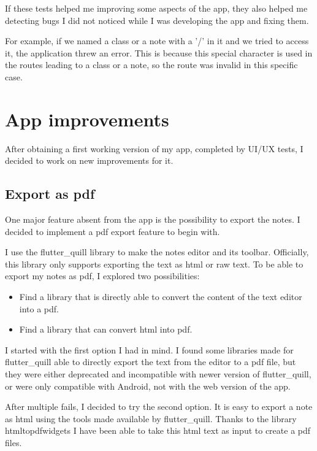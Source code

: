 \documentclass[]{article}
\begin{document}
	\pagebreak
	
	If these tests helped me improving some aspects of the app, they also helped me detecting bugs I did not noticed while I was developing the app and fixing them.\linebreak
	
	For example, if we named a class or a note with a '/' in it and we tried to access it, the application threw an error. This is because this special character is used in the routes leading to a class or a note, so the route was invalid in this specific case.
	
	\section{App improvements}
	
	After obtaining a first working version of my app, completed by UI/UX tests, I decided to work on new improvements for it.
	
	\subsection{Export as pdf}
	
	One major feature absent from the app is the possibility to export the notes.
	I decided to implement a pdf export feature to begin with.\linebreak
	
	I use the flutter\_quill library to make the notes editor and its toolbar.
	Officially, this library only supports exporting the text as html or raw text.
	To be able to export my notes as pdf, I explored two possibilities:
	
	\begin{itemize}
		\item Find a library that is directly able to convert the content of the text editor into a pdf.
		\item Find a library that can convert html into pdf.
	\end{itemize}
	
	I started with the first option I had in mind. I found some libraries made for flutter\_quill able to directly export the text from the editor to a pdf file, but they were either deprecated and incompatible with newer version of flutter\_quill, or were only compatible with Android, not with the web version of the app.\linebreak
	
	After multiple fails, I decided to try the second option. It is easy to export a note as html using the tools made available by flutter\_quill. Thanks to the library htmltopdfwidgets I have been able to take this html text as input to create a pdf files.\linebreak
	
\end{document}
